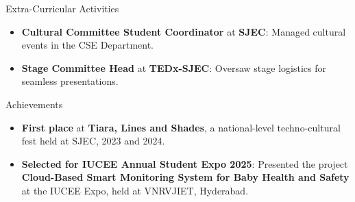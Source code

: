 \documentclass{resume} %
\begin{document}
\begin{rSection}{Extra-Curricular Activities}   
\begin{itemize}  
    \item \textbf{Cultural Committee Student Coordinator} at \textbf{SJEC}: Managed cultural events in the CSE Department.  

    \item \textbf{Stage Committee Head} at \textbf{TEDx-SJEC}: Oversaw stage logistics for seamless presentations.  
\end{itemize}  
\end{rSection}

\begin{rSection}{Achievements} 
    \begin{itemize}
        \item \textbf{First place} at \textbf{Tiara, Lines and Shades}, a national-level techno-cultural fest held at SJEC, 2023 and 2024.
        \item \textbf{Selected for IUCEE Annual Student Expo 2025}: Presented the project \textbf{Cloud-Based Smart Monitoring System for Baby Health and Safety} at the IUCEE Expo, held at VNRVJIET, Hyderabad.
        
    \end{itemize}
\end{rSection}
\end{document}
